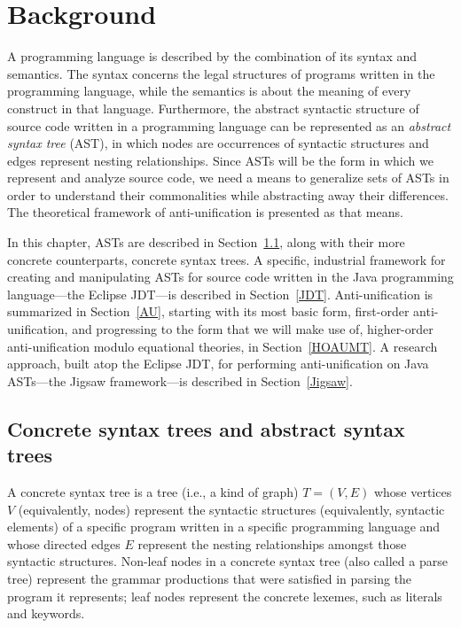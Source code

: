 \chapter{Background}  \label{background}
A programming language is described by the combination of its syntax and semantics. The syntax concerns the legal structures of programs written in the programming language, while the semantics is about the meaning of every construct in that language. Furthermore, the abstract syntactic structure of source code written in a programming language can be represented as an \emph{abstract syntax tree} (AST), in which nodes are occurrences of syntactic structures and edges represent nesting relationships. Since ASTs will be the form in which we represent and analyze source code, we need a means to generalize sets of ASTs in order to understand their commonalities while abstracting away their differences. The theoretical framework of anti-unification is presented as that means.

In this chapter, ASTs are described in Section~\ref{AST}, along with their more concrete counterparts, concrete syntax trees. A specific, industrial framework for creating and manipulating ASTs for source code written in the Java programming language---the Eclipse JDT---is described in Section~\ref{JDT}.  Anti-unification is summarized in Section~\ref{AU}, starting with its most basic form, first-order anti-unification, and progressing to the form that we will make use of, higher-order anti-unification modulo equational theories, in Section~\ref{HOAUMT}.  A research approach, built atop the Eclipse JDT, for performing anti-unification on Java ASTs---the Jigsaw framework---is described in Section~\ref{Jigsaw}.

\section{Concrete syntax trees and abstract syntax trees}\label{AST}

A concrete syntax tree is a tree (i.e., a kind of graph) $T=(V,E)$ whose vertices $V$ (equivalently, nodes) represent the syntactic structures (equivalently, syntactic elements) of a specific program written in a specific programming language and whose directed edges $E$ represent the nesting relationships amongst those syntactic structures.  Non-leaf nodes in a concrete syntax tree (also called a parse tree) represent the grammar productions that were satisfied in parsing the program it represents; leaf nodes represent the concrete lexemes, such as literals and keywords.

